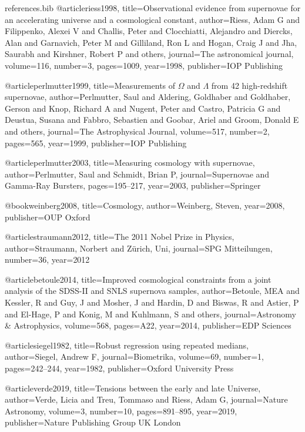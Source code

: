 \begin{filecontents}{references.bib}
@article{riess1998,
  title={Observational evidence from supernovae for an accelerating universe and a cosmological constant},
  author={Riess, Adam G and Filippenko, Alexei V and Challis, Peter and Clocchiatti, Alejandro and Diercks, Alan and Garnavich, Peter M and Gilliland, Ron L and Hogan, Craig J and Jha, Saurabh and Kirshner, Robert P and others},
  journal={The astronomical journal},
  volume={116},
  number={3},
  pages={1009},
  year={1998},
  publisher={IOP Publishing}
}

@article{perlmutter1999,
  title={Measurements of $\Omega$ and $\Lambda$ from 42 high-redshift supernovae},
  author={Perlmutter, Saul and Aldering, Goldhaber and Goldhaber, Gerson and Knop, Richard A and Nugent, Peter and Castro, Patricia G and Deustua, Susana and Fabbro, Sebastien and Goobar, Ariel and Groom, Donald E and others},
  journal={The Astrophysical Journal},
  volume={517},
  number={2},
  pages={565},
  year={1999},
  publisher={IOP Publishing}
}

@article{perlmutter2003,
  title={Measuring cosmology with supernovae},
  author={Perlmutter, Saul and Schmidt, Brian P},
  journal={Supernovae and Gamma-Ray Bursters},
  pages={195--217},
  year={2003},
  publisher={Springer}
}

@book{weinberg2008,
  title={Cosmology},
  author={Weinberg, Steven},
  year={2008},
  publisher={OUP Oxford}
}

@article{straumann2012,
  title={The 2011 Nobel Prize in Physics},
  author={Straumann, Norbert and Z{\"u}rich, Uni},
  journal={SPG Mitteilungen},
  number={36},
  year={2012}
}

@article{betoule2014,
  title={Improved cosmological constraints from a joint analysis of the SDSS-II and SNLS supernova samples},
  author={Betoule, MEA and Kessler, R and Guy, J and Mosher, J and Hardin, D and Biswas, R and Astier, P and El-Hage, P and Konig, M and Kuhlmann, S and others},
  journal={Astronomy \& Astrophysics},
  volume={568},
  pages={A22},
  year={2014},
  publisher={EDP Sciences}
}

@article{siegel1982,
  title={Robust regression using repeated medians},
  author={Siegel, Andrew F},
  journal={Biometrika},
  volume={69},
  number={1},
  pages={242--244},
  year={1982},
  publisher={Oxford University Press}
}

@article{verde2019,
  title={Tensions between the early and late Universe},
  author={Verde, Licia and Treu, Tommaso and Riess, Adam G},
  journal={Nature Astronomy},
  volume={3},
  number={10},
  pages={891--895},
  year={2019},
  publisher={Nature Publishing Group UK London}
}


\end{filecontents}
